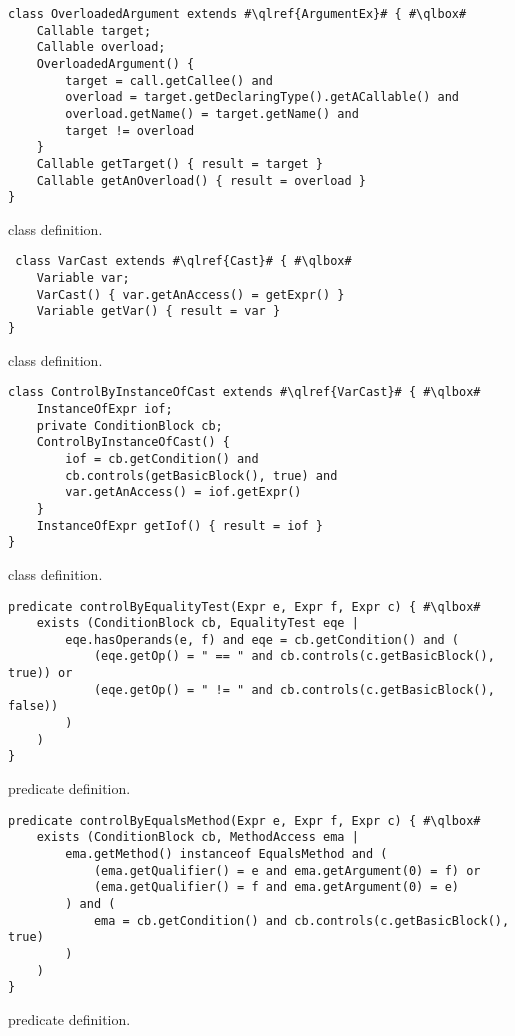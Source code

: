 \begin{listing}
\begin{verbatim}
class OverloadedArgument extends #\qlref{ArgumentEx}# { #\qlbox#
	Callable target;
	Callable overload;
	OverloadedArgument() {
		target = call.getCallee() and
		overload = target.getDeclaringType().getACallable() and
		overload.getName() = target.getName() and
		target != overload
	}
	Callable getTarget() { result = target }
	Callable getAnOverload() { result = overload }
}
\end{verbatim}
\caption{ class definition.}
\label{lst:ql:OverloadedArgument}
\end{listing}

\begin{listing}
\begin{verbatim}
 class VarCast extends #\qlref{Cast}# { #\qlbox#
	Variable var;
	VarCast() { var.getAnAccess() = getExpr() }
	Variable getVar() { result = var }
}
\end{verbatim}
\caption{ class definition.}
\label{lst:ql:VarCast}
\end{listing}

\begin{listing}
\begin{verbatim}	
class ControlByInstanceOfCast extends #\qlref{VarCast}# { #\qlbox#
	InstanceOfExpr iof;
	private ConditionBlock cb;
	ControlByInstanceOfCast() {
		iof = cb.getCondition() and
		cb.controls(getBasicBlock(), true) and
		var.getAnAccess() = iof.getExpr()
	}
	InstanceOfExpr getIof() { result = iof }
}
\end{verbatim}
\caption{ class definition.}
\label{lst:ql:ControlByInstanceOfCast}
\end{listing}


\begin{listing}
\begin{verbatim}	
predicate controlByEqualityTest(Expr e, Expr f, Expr c) { #\qlbox#
	exists (ConditionBlock cb, EqualityTest eqe |
		eqe.hasOperands(e, f) and eqe = cb.getCondition() and (
			(eqe.getOp() = " == " and cb.controls(c.getBasicBlock(), true)) or
			(eqe.getOp() = " != " and cb.controls(c.getBasicBlock(), false))
		)
	)
}
\end{verbatim}
\caption{ predicate definition.}
\label{lst:ql:controlByEqualityTest}
\end{listing}


\begin{listing}
\begin{verbatim}
predicate controlByEqualsMethod(Expr e, Expr f, Expr c) { #\qlbox#
	exists (ConditionBlock cb, MethodAccess ema |
		ema.getMethod() instanceof EqualsMethod and (
			(ema.getQualifier() = e and ema.getArgument(0) = f) or
			(ema.getQualifier() = f and ema.getArgument(0) = e)
		) and (
			ema = cb.getCondition() and cb.controls(c.getBasicBlock(), true)
		)
	)
}
\end{verbatim}
\caption{ predicate definition.}
\label{lst:ql:controlByEqualsMethod}
\end{listing}


